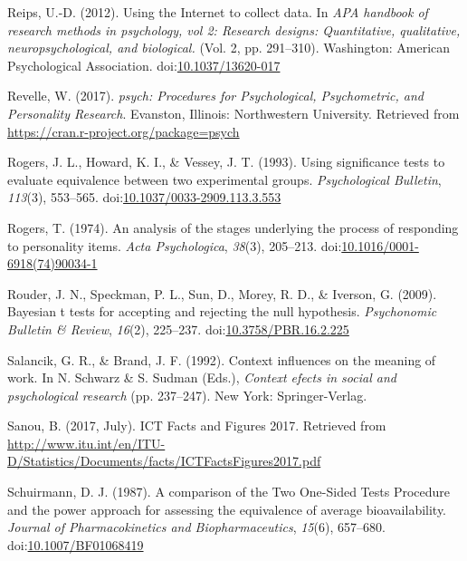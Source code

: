 \documentclass[english,man]{apa6}
\theoremstyle{definition}
\theoremstyle{definition}
\theoremstyle{definition}
\theoremstyle{remark}
\begin{document}
\hypertarget{ref-Reips2012}{}
Reips, U.-D. (2012). Using the Internet to collect data. In \emph{APA
handbook of research methods in psychology, vol 2: Research designs:
Quantitative, qualitative, neuropsychological, and biological.} (Vol. 2,
pp. 291--310). Washington: American Psychological Association.
doi:\href{https://doi.org/10.1037/13620-017}{10.1037/13620-017}

\hypertarget{ref-Revelle2017}{}
Revelle, W. (2017). \emph{psych: Procedures for Psychological,
Psychometric, and Personality Research}. Evanston, Illinois:
Northwestern University. Retrieved from
\url{https://cran.r-project.org/package=psych}

\hypertarget{ref-Rogers1993}{}
Rogers, J. L., Howard, K. I., \& Vessey, J. T. (1993). Using
significance tests to evaluate equivalence between two experimental
groups. \emph{Psychological Bulletin}, \emph{113}(3), 553--565.
doi:\href{https://doi.org/10.1037/0033-2909.113.3.553}{10.1037/0033-2909.113.3.553}

\hypertarget{ref-Rogers1974}{}
Rogers, T. (1974). An analysis of the stages underlying the process of
responding to personality items. \emph{Acta Psychologica}, \emph{38}(3),
205--213.
doi:\href{https://doi.org/10.1016/0001-6918(74)90034-1}{10.1016/0001-6918(74)90034-1}

\hypertarget{ref-Rouder2009}{}
Rouder, J. N., Speckman, P. L., Sun, D., Morey, R. D., \& Iverson, G.
(2009). Bayesian t tests for accepting and rejecting the null
hypothesis. \emph{Psychonomic Bulletin \& Review}, \emph{16}(2),
225--237.
doi:\href{https://doi.org/10.3758/PBR.16.2.225}{10.3758/PBR.16.2.225}

\hypertarget{ref-Salancik1992}{}
Salancik, G. R., \& Brand, J. F. (1992). Context influences on the
meaning of work. In N. Schwarz \& S. Sudman (Eds.), \emph{Context efects
in social and psychological research} (pp. 237--247). New York:
Springer-Verlag.

\hypertarget{ref-Sanou2017}{}
Sanou, B. (2017, July). ICT Facts and Figures 2017. Retrieved from
\url{http://www.itu.int/en/ITU-D/Statistics/Documents/facts/ICTFactsFigures2017.pdf}

\hypertarget{ref-Schuirmann1987}{}
Schuirmann, D. J. (1987). A comparison of the Two One-Sided Tests
Procedure and the power approach for assessing the equivalence of
average bioavailability. \emph{Journal of Pharmacokinetics and
Biopharmaceutics}, \emph{15}(6), 657--680.
doi:\href{https://doi.org/10.1007/BF01068419}{10.1007/BF01068419}
\end{document}
